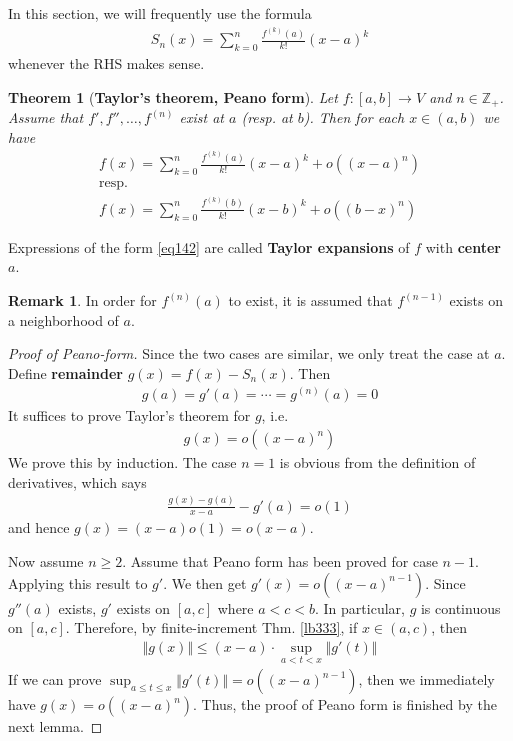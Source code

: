 \documentclass[12pt,b5paper,notitlepage]{article}
\theoremstyle{definition}
\newtheorem{rem}[df]{Remark}
\theoremstyle{plain}
\newtheorem{thm}[df]{Theorem}
\newcommand{\Zbb}{\mathbb Z}
\numberwithin{equation}{section}
\begin{document}
In this section, we will frequently use the formula
\begin{align}
S_n(x)=\sum_{k=0}^n\frac{f^{(k)}(a)}{k!}(x-a)^k
\end{align}
whenever the RHS makes sense.


\begin{thm}[\textbf{Taylor's theorem, Peano form}]\label{lb360}
Let $f:[a,b]\rightarrow V$ and $n\in\Zbb_+$. Assume that $f',f'',\dots,f^{(n)}$ exist at $a$ (resp. at $b$). Then for each $x\in (a,b)$ we have
\begin{subequations}
\begin{gather}
f(x)=\sum_{k=0}^n\frac{f^{(k)}(a)}{k!}(x-a)^k+o((x-a)^n)\label{eq142}\\
\text{resp.}\nonumber\\
f(x)=\sum_{k=0}^n\frac{f^{(k)}(b)}{k!}(x-b)^k+o((b-x)^n) \label{eq143}
\end{gather}
\end{subequations}
\end{thm}


Expressions of the form \eqref{eq142} are called \textbf{Taylor expansions}  of $f$ with \textbf{center} $a$.

\begin{rem}
In order for $f^{(n)}(a)$ to exist, it is assumed that $f^{(n-1)}$ exists on a neighborhood of $a$.
\end{rem}


\begin{proof}[Proof of Peano-form]
Since the two cases are similar, we only treat the case at $a$. Define \textbf{remainder}  $g(x)=f(x)-S_n(x)$. Then
\begin{align}
g(a)=g'(a)=\cdots=g^{(n)}(a)=0  \label{eq140}
\end{align}
It suffices to prove Taylor's theorem for $g$, i.e.
\begin{align}
g(x)=o((x-a)^n)
\end{align}
We prove this by induction. The case $n=1$ is obvious from the definition of derivatives, which says
\begin{align}
\frac{g(x)-g(a)}{x-a}-g'(a)=o(1)
\end{align}
and hence $g(x)=(x-a)o(1)=o(x-a)$. 

Now assume $n\geq 2$. Assume that Peano form has been proved for case $n-1$. Applying this result to $g'$. We then get $g'(x)=o((x-a)^{n-1})$. Since $g''(a)$ exists,  $g'$ exists on $[a,c]$ where $a<c<b$. In particular, $g$ is continuous on $[a,c]$. Therefore, by finite-increment Thm. \ref{lb333}, if $x\in(a,c)$, then
\begin{align*}
\Vert g(x)\Vert\leq (x-a)\cdot\sup_{a<t<x}\Vert g'(t)\Vert
\end{align*}
If we can prove $\sup_{a\leq t\leq x}\Vert g'(t)\Vert=o((x-a)^{n-1})$, then we immediately have $g(x)=o((x-a)^n)$. Thus, the proof of Peano form is finished by the next lemma.
\end{proof}
\end{document}
